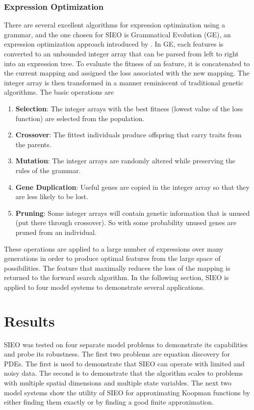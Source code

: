 \documentclass{article}
\begin{document}
\subsubsection{Expression Optimization}
There are several excellent algorithms for expression optimization using a grammar, and the one chosen for SIEO is Grammatical Evolution (GE), an expression optimization approach introduced by \citet{ryan1998grammatical}. In GE, each features is converted to an unbounded integer array that can be parsed from left to right into an expression tree. To evaluate the fitness of an feature, it is concatenated to the current mapping and assigned the loss associated with the new mapping. The integer array is then transformed in a manner reminiscent of traditional genetic algorithms. The basic operations are
\begin{enumerate}
\item \textbf{Selection}: The integer arrays with the best fitness (lowest value of the loss function) are selected from the population.
\item \textbf{Crossover}: The fittest individuals produce offspring that carry traits from the parents.
\item \textbf{Mutation}: The integer arrays are randomly altered while preserving the rules of the grammar.
\item \textbf{Gene Duplication}: Useful genes are copied in the integer array so that they are less likely to be lost.
\item \textbf{Pruning}: Some integer arrays will contain genetic information that is unused (put there through crossover). So with some probability unused genes are pruned from an individual.
\end{enumerate}

These operations are applied to a large number of expressions over many generations in order to produce optimal features from the large space of possibilities. The feature that maximally reduces the loss of the mapping is returned to the forward search algorithm. In the following section, SIEO is applied to four model systems to demonstrate several applications.

\section{Results}
\label{results}
SIEO was tested on four separate model problems to demonstrate its capabilities and probe its robustness. The first two problems are equation discovery for PDEs. The first is used to demonstrate that SIEO can operate with limited and noisy data. The second is to demonstrate that the algorithm scales to problems with multiple spatial dimensions and multiple state variables. The next two model systems show the utility of SIEO for approximating Koopman functions by either finding them exactly or by finding a good finite approximation.
\end{document}
